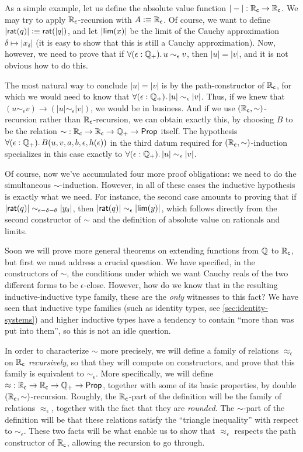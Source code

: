 \begin{eg}
As a simple example, let us define the absolute value function $|-| : \mathbb{R}_\mathsf{c} \to \mathbb{R}_\mathsf{c}$.
We may try to apply $\mathbb{R}_\mathsf{c}$-recursion with $A\vcentcolon\equiv \mathbb{R}_\mathsf{c}$.
Of course, we want to define $|\mathsf{rat}(q)| \vcentcolon\equiv \mathsf{rat}(|q|)$, and let $|\mathsf{lim}(x)|$ be the limit of the Cauchy approximation $\delta\mapsto |x_\delta|$ (it is easy to show that this is still a Cauchy approximation).
Now, however, we need to prove that if $\fall{\epsilon:\Qp} u\sim_\epsilon v$, then $|u|=|v|$, and it is not obvious how to do this.

The most natural way to conclude $|u|=|v|$ is by the path-constructor of $\mathbb{R}_\mathsf{c}$, for which we would need to know that $\fall{\epsilon:\Qp} |u|\sim_\epsilon |v|$.
Thus, if we knew that $(u\sim_\epsilon v) \to (|u|\sim_\epsilon|v|)$, we would be in business.
And if we use $(\mathbb{R}_\mathsf{c},\sim)$-recursion rather than $\mathbb{R}_\mathsf{c}$-recursion, we can obtain exactly this, by choosing $B$ to be the relation $\mathord\sim :\mathbb{R}_\mathsf{c}\to\mathbb{R}_\mathsf{c}\to\mathbb{Q}_{+}\to\mathsf{Prop}$ itself.
The hypothesis $\fall{\epsilon:\Qp} B(u,v,a,b,\epsilon,h(\epsilon))$ in the third datum required for $(\mathbb{R}_\mathsf{c},\sim)$-induction specializes in this case exactly to $\fall{\epsilon:\Qp} |u|\sim_\epsilon |v|$.

Of course, now we've accumulated four more proof obligations: we need to do the simultaneous $\sim$-induction.
However, in all of these cases the inductive hypothesis is exactly what we need.
For instance, the second case amounts to proving that if $|\mathsf{rat}(q)| \sim_{\epsilon-\delta-\theta} |y_\delta|$, then $|\mathsf{rat}(q)| \sim_\epsilon |\mathsf{lim}(y)|$, which follows directly from the second constructor of $\sim$ and the definition of absolute value on rationals and limits.
\end{eg}

Soon we will prove more general theorems on extending functions from $\mathbb{Q}$ to $\mathbb{R}_\mathsf{c}$, but first we must address a crucial question.
We have specified, in the constructors of $\sim$, the conditions under which we want Cauchy reals of the two different forms to be $\epsilon$-close.
However, how do we know that in the resulting inductive-inductive type family, these are the \emph{only} witnesses to this fact?
We have seen that inductive type families (such as identity types, see \autoref{sec:identity-systems}) and higher inductive types have a tendency to contain ``more than was put into them'', so this is not an idle question.

In order to characterize $\sim$ more precisely, we will define a family of relations $\approx_\epsilon$ on $\mathbb{R}_\mathsf{c}$ \emph{recursively}, so that they will compute on constructors, and prove that this family is equivalent to $\sim_\epsilon$.
More specifically, we will define $\mathord\approx:\mathbb{R}_\mathsf{c}\to\mathbb{R}_\mathsf{c}\to\mathbb{Q}_{+}\to\mathsf{Prop}$, together with some of its basic properties, by double $(\mathbb{R}_\mathsf{c},\sim)$-recursion.
Roughly, the $\mathbb{R}_\mathsf{c}$-part of the definition will be the family of relations $\approx_\epsilon$, together with the fact that they are \emph{rounded}.
The $\sim$-part of the definition will be that these relations satisfy the ``triangle inequality'' with respect to $\sim_\epsilon$.
These two facts will be what enable us to show that $\approx_\epsilon$ respects the path constructor of $\mathbb{R}_\mathsf{c}$, allowing the recursion to go through.

